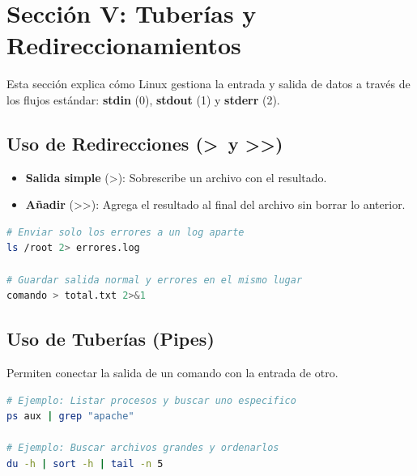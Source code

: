 \documentclass[12pt,a4paper]{article}
\begin{document}
\section{Sección V: Tuberías y Redireccionamientos}
Esta sección explica cómo Linux gestiona la entrada y salida de datos a través de los flujos estándar: \textbf{stdin} (0), \textbf{stdout} (1) y \textbf{stderr} (2).

\subsection{Uso de Redirecciones (\textgreater\ y \textgreater\textgreater)}
\begin{itemize}
    \item \textbf{Salida simple} (\textgreater): Sobrescribe un archivo con el resultado.
    \item \textbf{Añadir} (\textgreater\textgreater): Agrega el resultado al final del archivo sin borrar lo anterior.
\end{itemize}

\begin{lstlisting}[language=bash]
# Enviar solo los errores a un log aparte
ls /root 2> errores.log

# Guardar salida normal y errores en el mismo lugar
comando > total.txt 2>&1
\end{lstlisting}

\subsection{Uso de Tuberías (Pipes)}
Permiten conectar la salida de un comando con la entrada de otro.
\begin{lstlisting}[language=bash]
# Ejemplo: Listar procesos y buscar uno especifico
ps aux | grep "apache"

# Ejemplo: Buscar archivos grandes y ordenarlos
du -h | sort -h | tail -n 5
\end{lstlisting}
\end{document}
